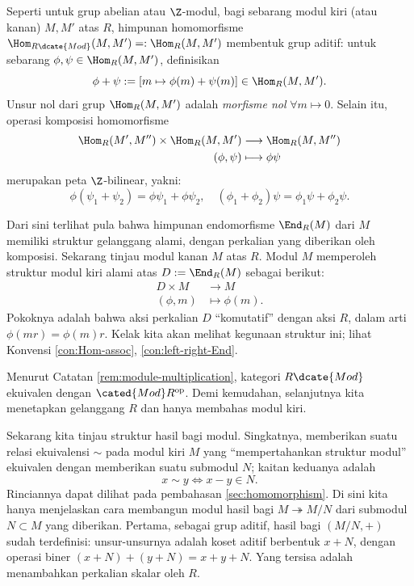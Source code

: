 \begin{remark}\label{rem:Mod-cat-preadditive}
	Seperti untuk grup abelian atau $\Z$-modul, bagi sebarang modul kiri (atau kanan) $M, M'$ atas $R$, himpunan homomorfisme $\Hom_{R\dcate{Mod}}(M, M') =: \Hom_R(M, M')$ membentuk grup aditif: untuk sebarang $\phi, \psi \in \Hom_R(M, M')$, definisikan
	\[ \phi + \psi := [m \mapsto \phi(m) + \psi(m) ] \in \Hom_R(M, M'). \]
	Unsur nol dari grup $\Hom_R(M, M')$ adalah \emph{morfisme nol} $\forall m \mapsto 0$. Selain itu, operasi komposisi homomorfisme
	\begin{align*}
		\Hom_R(M', M'') \times \Hom_R(M, M') & \longrightarrow \Hom_R(M, M'') \\
		(\phi, \psi) & \longmapsto \phi \psi
	\end{align*}
	merupakan peta $\Z$-bilinear, yakni:
	\[ \phi(\psi_1 + \psi_2) = \phi\psi_1 + \phi\psi_2, \quad (\phi_1 + \phi_2)\psi = \phi_1\psi + \phi_2\psi. \]

	Dari sini terlihat pula bahwa himpunan endomorfisme $\End_R(M)$ dari $M$ memiliki struktur gelanggang alami, dengan perkalian yang diberikan oleh komposisi. Sekarang tinjau modul kanan $M$ atas $R$. Modul $M$ memperoleh struktur modul kiri alami atas $D := \End_R(M)$ sebagai berikut:
	\begin{align*}
		D \times M & \longrightarrow M \\
		(\phi, m) & \longmapsto \phi(m).
	\end{align*}
	Pokoknya adalah bahwa aksi perkalian $D$ ``komutatif'' dengan aksi $R$, dalam arti $\phi(mr)=\phi(m)r$. Kelak kita akan melihat kegunaan struktur ini; lihat Konvensi \ref{con:Hom-assoc}, \ref{con:left-right-End}.
\end{remark}

Menurut Catatan \ref{rem:module-multiplication}, kategori $R\dcate{Mod}$ ekuivalen dengan $\cated{Mod}R^\text{op}$. Demi kemudahan, selanjutnya kita menetapkan gelanggang $R$ dan hanya membahas modul kiri.

Sekarang kita tinjau struktur hasil bagi modul. Singkatnya, memberikan suatu relasi ekuivalensi $\sim$ pada modul kiri $M$ yang ``mempertahankan struktur modul'' ekuivalen dengan memberikan suatu submodul $N$; kaitan keduanya adalah
\[ x \sim y \iff x-y \in N. \]
Rinciannya dapat dilihat pada pembahasan \ref{sec:homomorphism}. Di sini kita hanya menjelaskan cara membangun modul hasil bagi $M \twoheadrightarrow M/N$ dari submodul $N \subset M$ yang diberikan. Pertama, sebagai grup aditif, hasil bagi $(M/N, +)$ sudah terdefinisi: unsur-unsurnya adalah koset aditif berbentuk $x+N$, dengan operasi biner $(x+N) + (y+N) = x+y + N$. Yang tersisa adalah menambahkan perkalian skalar oleh $R$.

